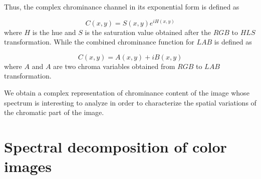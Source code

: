 Thus, the complex chrominance channel in its exponential form is defined as  

\begin{equation}\label{eq:chrominance_hsv}
    C(x,y) = S(x,y) e^{iH(x,y)}
\end{equation}
where $H$ is the hue and $S$ is the saturation value obtained after the $RGB$ to $HLS$ transformation. While the combined chrominance function for $LAB$ is defined as

\begin{equation}\label{eq:chrominance_lab}
    C(x,y) = A(x,y) + iB(x,y)
\end{equation}
where $A$ and $A$ are two chroma variables obtained from $RGB$ to $LAB$ transformation. 

We obtain a complex representation of chrominance content of the image whose spectrum is interesting to analyze in order to characterize the spatial variations of the chromatic part of the image. 

\section{Spectral decomposition of color images}


